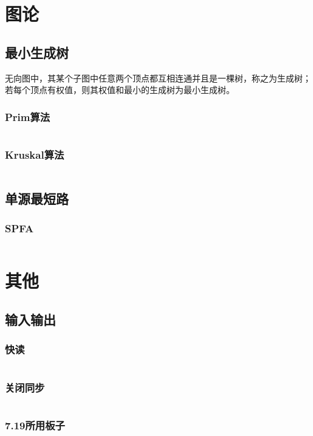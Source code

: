 \documentclass[a4paper,11pt]{article}
\begin{document}
\newpage
\section{图论} %
\subsection{最小生成树} %
无向图中，其某个子图中任意两个顶点都互相连通并且是一棵树，称之为生成树；若每个顶点有权值，则其权值和最小的生成树为最小生成树。
\subsubsection{Prim算法}
\inputminted[breaklines,linenos,frame=leftline]{c++}{graph/prim.cpp}
\subsubsection{Kruskal算法} %
\inputminted[breaklines,linenos,frame=leftline]{c++}{graph/kruskal.cpp}
\subsection{单源最短路}
\subsubsection{SPFA}
\inputminted[breaklines]{c++}{graph/spfa.cc}

\newpage
\section{其他}
\subsection{输入输出}
\subsubsection{快读}
\inputminted[breaklines,linenos,frame=leftline]{c++}{others/read1.cpp}
\subsubsection{关闭同步}
\inputminted[breaklines,linenos,frame=leftline]{c++}{others/read2.cpp}
\subsubsection{7.19所用板子}
\inputminted[breaklines,linenos,frame=leftline]{c++}{others/7.19.cpp}
\end{document}
